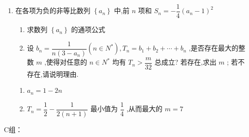 \begin{enumerate}
\begin{jieda}
        即有 $ \dfrac{5}{3} - \dfrac{1}{2}\left( {\dfrac{1}{n} + \dfrac{1}{n + 1}}\right)  < \dfrac{5}{3} - \dfrac{1}{n + 1} $
        则当 $ n \geq  3 $ 时,不等式成立.
        
        检验 $ n = 1,2 $ 时,不等式也成立,综上对一切正整数 $n$ ,有 $ \dfrac{1}{{a}_{1}} + \dfrac{1}{{a}_{2}} + \ldots  + \dfrac{1}{{a}_{n}} < \dfrac{5}{3} - \dfrac{1}{n + 1} $ .
    \end{jieda}
    
    \item 在各项为负的非等比数列 $\left\{  {a}_{n}\right\}$ 中,前 $n$ 项和 ${S}_{n} =  - \dfrac{1}{4}{\left( {a}_{n} - 1\right) }^{2}$
    \begin{enumerate}
        \item 求数列 $\left\{  {a}_{n}\right\}$ 的通项公式
        \item 设 ${b}_{n} = \dfrac{1}{n\left( {3 - {a}_{n}}\right) }\left( {n \in  {N}^{ * }}\right) ,{T}_{n} = {b}_{1} + {b}_{2} + \cdots  + {b}_{n}$ ,是否存在最大的整数 $m$ ,使得对任意的 $n \in  {N}^{ * }$ 均有 ${T}_{n} > \dfrac{m}{32}$ 总成立? 若存在,求出 $m$ ; 若不存在,请说明理由.
    \end{enumerate}
    \begin{jieda}
        \begin{enumerate}
            \item ${a}_{n} = 1 - {2n}$ 
            \item ${T}_{n} = \dfrac{1}{2} - \dfrac{1}{2\left( {n + 1}\right) }$ 最小值为 $\dfrac{1}{4}$ ,从而最大的 $m = 7$
            
        \end{enumerate}
    \end{jieda}
\end{enumerate}
C组：
